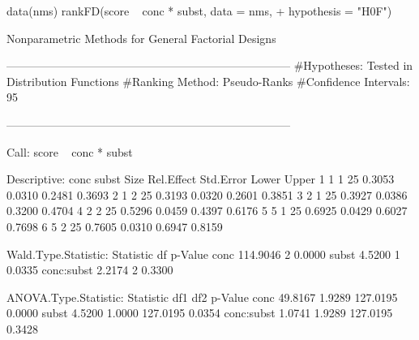 \begin{example}
data(nms)	
rankFD(score ~ conc * subst, data = nms, 
+	  hypothesis = "H0F")
\end{example}
\begin{example}

Nonparametric Methods for General Factorial Designs      

---------------------------------------------------------------------------
#Hypotheses: Tested in Distribution Functions 
#Ranking Method: Pseudo-Ranks 
#Confidence Intervals: 95 %

---------------------------------------------------------------------------

Call:
score ~ conc * subst

Descriptive:
  conc subst Size Rel.Effect Std.Error  Lower  Upper
1    1     1   25     0.3053    0.0310 0.2481 0.3693
2    1     2   25     0.3193    0.0320 0.2601 0.3851
3    2     1   25     0.3927    0.0386 0.3200 0.4704
4    2     2   25     0.5296    0.0459 0.4397 0.6176
5    5     1   25     0.6925    0.0429 0.6027 0.7698
6    5     2   25     0.7605    0.0310 0.6947 0.8159

Wald.Type.Statistic:
            Statistic df p-Value
conc        114.9046  2  0.0000
subst         4.5200  1  0.0335
conc:subst    2.2174  2  0.3300

ANOVA.Type.Statistic:
            Statistic    df1   df2   p-Value
conc         49.8167 1.9289 127.0195  0.0000
subst         4.5200 1.0000 127.0195  0.0354
conc:subst    1.0741 1.9289 127.0195  0.3428


\end{example}

